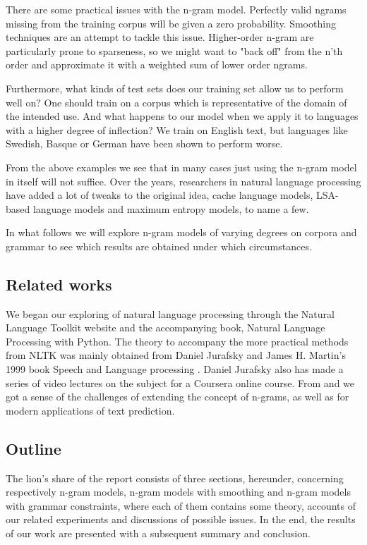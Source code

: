 \documentclass[a4paper,12pt]{article}
\begin{document}
There are some practical issues with the n-gram model. Perfectly valid ngrams missing from the training corpus will be given a zero probability. Smoothing techniques are an attempt to tackle this issue. Higher-order n-gram are particularly prone to sparseness, so we might want to "back off" from the n'th order and approximate it with a weighted sum of lower order ngrams. 

Furthermore, what kinds of test sets does our training set allow us to perform well on? One should train on a  corpus which is representative of the domain of the intended use. And what happens to our model when we apply it to languages with a higher degree of inflection? We train on English text, but languages like Swedish, Basque or German have been shown to perform worse. 

From the above examples we see that in many cases just using the n-gram model in itself will not suffice. Over the years, researchers in natural language processing have added a lot of tweaks to the original idea, cache language models, LSA-based language models and maximum entropy models, to name a few.

In what follows we will explore n-gram models of varying degrees on corpora and grammar to see which results are obtained under which circumstances.

\subsection{Related works}
We began our exploring of natural language processing through the Natural Language Toolkit website and the accompanying book, Natural Language Processing with Python. The theory to accompany the more practical methods from NLTK was mainly obtained from Daniel Jurafsky and James H. Martin's 1999 book Speech and Language processing \cite{JurafskyBook}. Daniel Jurafsky also has made a series of video lectures on the subject for a Coursera online course. From \cite{brown1992class} and \cite{garay2006text} we got a sense of the challenges of extending the concept of n-grams, as well as for modern applications of text prediction.

\subsection{Outline}
The lion's share of the report consists of three sections, hereunder, concerning respectively n-gram models, n-gram models with smoothing and n-gram models with grammar constraints, where each of them contains some theory, accounts of our related experiments and discussions of possible issues. In the end, the results of our work are presented with a subsequent summary and conclusion.
\end{document}
